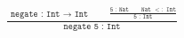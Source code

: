 \documentclass{standalone}
\def\*{\displaystyle}
\begin{document}
$\*
\frac
{\*
\begin{array}{c}
\\
\texttt{negate :~Int $\rightarrow$ Int}
\end{array}
\qquad
\frac
{\*
\texttt{5 :~Nat}
\qquad
\texttt{Nat $<:$ Int}
}{\texttt{5 :~Int}}
}
{\texttt{negate 5 :~Int}}
$
\end{document}
